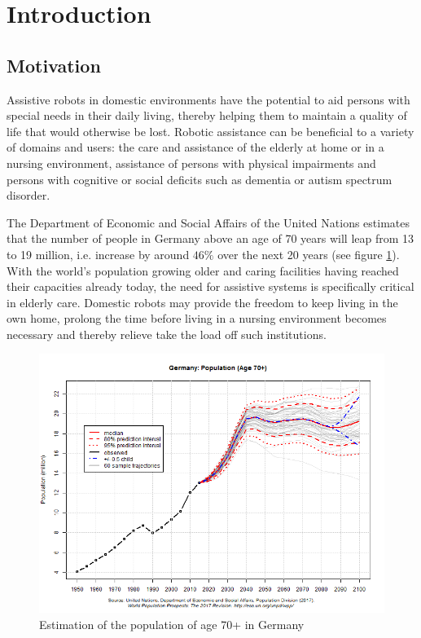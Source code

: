 \section{Introduction}
\subsection{Motivation}
Assistive robots in domestic environments have the potential to aid persons with special needs in their daily living, thereby helping them to maintain a quality of life that would otherwise be lost.
Robotic assistance can be beneficial to a variety of domains and users: the care and assistance of the elderly at home or in a nursing environment, assistance of persons with physical impairments and persons with cognitive or social deficits such as dementia or autism spectrum disorder.

The Department of Economic and Social Affairs of the United Nations estimates that the number of people in Germany above an age of 70 years will leap from 13 to 19 million, i.e. increase by around $46\%$ over the next 20 years (see figure \ref{fig:population_germany}).
With the world's population growing older and caring facilities having reached their capacities already today, the need for assistive systems is specifically critical in elderly care.
Domestic robots may provide the freedom to keep living in the own home, prolong the time before living in a nursing environment becomes necessary and thereby relieve take the load off such institutions.

\begin{figure}[H]
    \centering
    \includegraphics[width=\textwidth]{img_introduction/Germany.png}
    \caption{Estimation of the population of age 70+ in Germany}
    \label{fig:population_germany}
\end{figure}

